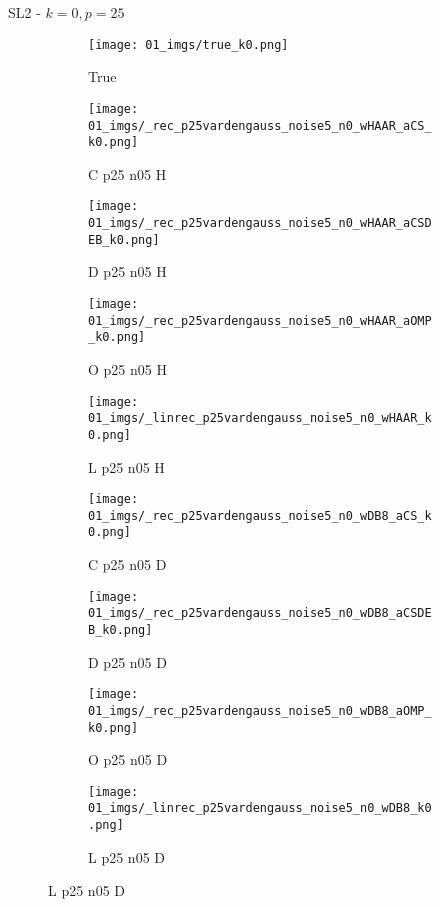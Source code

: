 \begin{frame}{SL2 - $k=0,p=25$}{}
\begin{figure}
\begin{subfigure}{0.1\textwidth}
\texttt{[image: 01\_imgs/true\_k0.png]}
\caption*{\Tiny True}
\end{subfigure}
\begin{subfigure}{0.1\textwidth}
\texttt{[image: 01\_imgs/\_rec\_p25vardengauss\_noise5\_n0\_wHAAR\_aCS\_k0.png]}
\caption*{\Tiny C p25 n05 H}
\end{subfigure}
\begin{subfigure}{0.1\textwidth}
\texttt{[image: 01\_imgs/\_rec\_p25vardengauss\_noise5\_n0\_wHAAR\_aCSDEB\_k0.png]}
\caption*{\Tiny D p25 n05 H}
\end{subfigure}
\begin{subfigure}{0.1\textwidth}
\texttt{[image: 01\_imgs/\_rec\_p25vardengauss\_noise5\_n0\_wHAAR\_aOMP\_k0.png]}
\caption*{\Tiny O p25 n05 H}
\end{subfigure}
\begin{subfigure}{0.1\textwidth}
\texttt{[image: 01\_imgs/\_linrec\_p25vardengauss\_noise5\_n0\_wHAAR\_k0.png]}
\caption*{\Tiny L p25 n05 H}
\end{subfigure}
\begin{subfigure}{0.1\textwidth}
\texttt{[image: 01\_imgs/\_rec\_p25vardengauss\_noise5\_n0\_wDB8\_aCS\_k0.png]}
\caption*{\Tiny C p25 n05 D}
\end{subfigure}
\begin{subfigure}{0.1\textwidth}
\texttt{[image: 01\_imgs/\_rec\_p25vardengauss\_noise5\_n0\_wDB8\_aCSDEB\_k0.png]}
\caption*{\Tiny D p25 n05 D}
\end{subfigure}
\begin{subfigure}{0.1\textwidth}
\texttt{[image: 01\_imgs/\_rec\_p25vardengauss\_noise5\_n0\_wDB8\_aOMP\_k0.png]}
\caption*{\Tiny O p25 n05 D}
\end{subfigure}
\begin{subfigure}{0.1\textwidth}
\texttt{[image: 01\_imgs/\_linrec\_p25vardengauss\_noise5\_n0\_wDB8\_k0.png]}
\caption*{\Tiny L p25 n05 D}
\end{subfigure}

\vspace{5pt}


\end{figure}
\end{frame}
